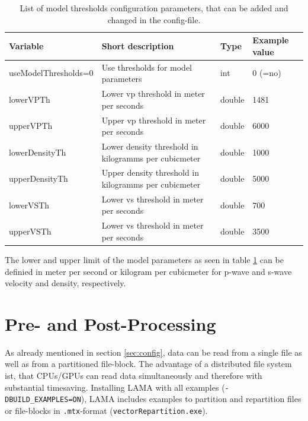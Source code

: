 \documentclass[pdftex,a4paper,parskip,listof=totoc,bibliography=totoc,onehalfspacing,12pt]{scrreprt}
\newcommand{\shellcmd}[1]{\indent\indent\texttt{#1}}	%
\begin{document}
\begin{table}[h!]
\caption[List of model thresholds configuration parameters.]{List of model thresholds configuration parameters, that can be added and changed in the config-file.}\label{tab:config_thresholds}
\centering
\begin{adjustbox}{width=1\textwidth,center=\textwidth}
	\begin{tabular}{llll}
	\toprule
         Variable                 & Short description                                                   & Type   & Example value \\
	\midrule
         useModelThresholds=0     & Use thresholds for model parameters                                 &  int   & 0 (=no) \\
         lowerVPTh                & Lower vp threshold in meter per seconds                             & double & 1481 \\
         upperVPTh                & Upper vp threshold in meter per seconds                             & double & 6000 \\
         lowerDensityTh           & Lower density threshold in kilogramms per cubicmeter                 & double & 1000 \\
         upperDensityTh           & Upper density threshold in kilogramms per cubicmeter                 & double & 5000 \\
         lowerVSTh                & Lower vs threshold in meter per seconds                             & double & 700 \\
         upperVSTh                & Lower vs threshold in meter per seconds                             & double & 3500 \\
	\bottomrule
	\end{tabular}
	\end{adjustbox}
\end{table}
The lower and upper limit of the model parameters as seen in table \ref{tab:config_thresholds} can be definied in meter per second or kilogram per cubicmeter for p-wave and s-wave velocity and density, respectively.

\clearpage
\section{Pre- and Post-Processing}\label{sec:process}

As already mentioned in section \ref{sec:config}, data can be read from a single file as well as from a partitioned file-block. The advantage of a distributed file system ist, that CPUs/GPUs can read data simultaneously and therefore with substantial timesaving. Installing LAMA with all examples (\shellcmd{-DBUILD\_EXAMPLES=ON}), LAMA includes examples to partition and repartition files or file-blocks in \shellcmd{.mtx}-format (\shellcmd{vectorRepartition.exe}). 
\end{document}
